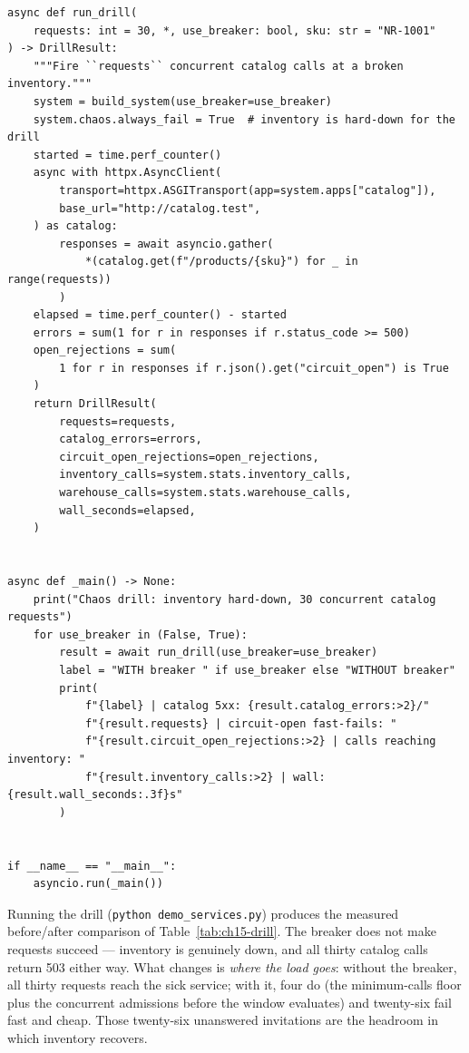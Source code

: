 \begin{verbatim}
async def run_drill(
    requests: int = 30, *, use_breaker: bool, sku: str = "NR-1001"
) -> DrillResult:
    """Fire ``requests`` concurrent catalog calls at a broken inventory."""
    system = build_system(use_breaker=use_breaker)
    system.chaos.always_fail = True  # inventory is hard-down for the drill
    started = time.perf_counter()
    async with httpx.AsyncClient(
        transport=httpx.ASGITransport(app=system.apps["catalog"]),
        base_url="http://catalog.test",
    ) as catalog:
        responses = await asyncio.gather(
            *(catalog.get(f"/products/{sku}") for _ in range(requests))
        )
    elapsed = time.perf_counter() - started
    errors = sum(1 for r in responses if r.status_code >= 500)
    open_rejections = sum(
        1 for r in responses if r.json().get("circuit_open") is True
    )
    return DrillResult(
        requests=requests,
        catalog_errors=errors,
        circuit_open_rejections=open_rejections,
        inventory_calls=system.stats.inventory_calls,
        warehouse_calls=system.stats.warehouse_calls,
        wall_seconds=elapsed,
    )


async def _main() -> None:
    print("Chaos drill: inventory hard-down, 30 concurrent catalog requests")
    for use_breaker in (False, True):
        result = await run_drill(use_breaker=use_breaker)
        label = "WITH breaker " if use_breaker else "WITHOUT breaker"
        print(
            f"{label} | catalog 5xx: {result.catalog_errors:>2}/"
            f"{result.requests} | circuit-open fast-fails: "
            f"{result.circuit_open_rejections:>2} | calls reaching inventory: "
            f"{result.inventory_calls:>2} | wall: {result.wall_seconds:.3f}s"
        )


if __name__ == "__main__":
    asyncio.run(_main())
\end{verbatim}

Running the drill ({\small\texttt{python demo\_services.py}}) produces the
measured before/after comparison of Table~\ref{tab:ch15-drill}. The
breaker does not make requests succeed --- inventory is genuinely down, and
all thirty catalog calls return 503 either way. What changes is
\emph{where the load goes}: without the breaker, all thirty requests reach
the sick service; with it, four do (the minimum-calls floor plus the
concurrent admissions before the window evaluates) and twenty-six fail fast
and cheap. Those twenty-six unanswered invitations are the headroom in
which inventory recovers.

